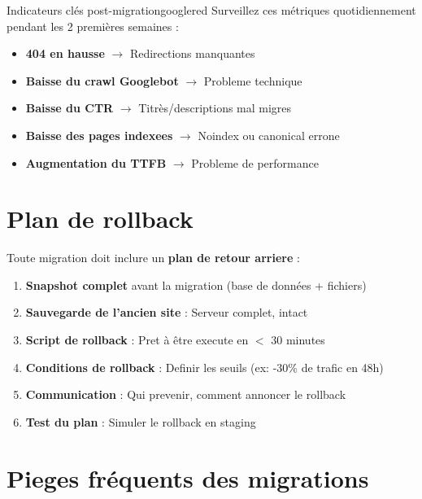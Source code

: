\documentclass[12pt,a4paper,twoside]{report}
\newcommand{\important}[1]{\textbf{\textcolor{googlered}{#1}}}
\begin{document}
\begin{mybox}{Indicateurs clés post-migration}{googlered}
Surveillez ces métriques quotidiennement pendant les 2 premières semaines :
\begin{itemize}
    \item \textbf{404 en hausse} $\rightarrow$ Redirections manquantes
    \item \textbf{Baisse du crawl Googlebot} $\rightarrow$ Probleme technique
    \item \textbf{Baisse du CTR} $\rightarrow$ Titrès/descriptions mal migres
    \item \textbf{Baisse des pages indexees} $\rightarrow$ Noindex ou canonical errone
    \item \textbf{Augmentation du TTFB} $\rightarrow$ Probleme de performance
\end{itemize}
\end{mybox}

\section{Plan de rollback}

Toute migration doit inclure un \important{plan de retour arriere} :

\begin{enumerate}
    \item \textbf{Snapshot complet} avant la migration (base de données + fichiers)
    \item \textbf{Sauvegarde de l'ancien site} : Serveur complet, intact
    \item \textbf{Script de rollback} : Pret à être execute en $<$ 30 minutes
    \item \textbf{Conditions de rollback} : Definir les seuils (ex: -30\% de trafic en 48h)
    \item \textbf{Communication} : Qui prevenir, comment annoncer le rollback
    \item \textbf{Test du plan} : Simuler le rollback en staging
\end{enumerate}

\section{Pieges fréquents des migrations}
\end{document}
